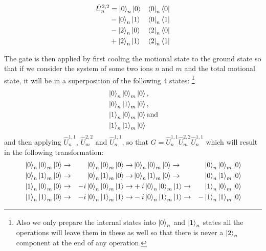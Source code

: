 \begin{equation}
    \begin{aligned}
        \hat{U}^{2,2}_n &= \ket{0}_n\ket{0}&\bra{0}_n\bra{0} \\
        &- \ket{0}_n\ket{1}&\bra{0}_n\bra{1} \\
        &- \ket{2}_n\ket{0}&\bra{2}_n\bra{0} \\
        &+ \ket{2}_n\ket{1}&\bra{2}_n\bra{1}
    \end{aligned}
\end{equation}

The gate is then applied by first cooling the motional state to the ground state so that if we consider the system of some two ions $n$ and $m$ and the total motional state, it will be in a superposition of the following 4 states:
\footnote{Also we only prepare the internal states into $\ket{0}_n$ and $\ket{1}_n$ states all the operations will leave them in these as well so that there is never a $\ket{2}_n$ component at the end of any operation.}
\begin{equation}\label{eqn:ovrl_states}
    \begin{aligned}
        &\ket{0}_n\ket{0}_m\ket{0}, \\
        &\ket{0}_n\ket{1}_m\ket{0}, \\
        &\ket{1}_n\ket{0}_m\ket{0} \text{and} \\
        &\ket{1}_n\ket{1}_m\ket{0}
    \end{aligned}
\end{equation}
and then applying $\hat{U}^{1,1}_n$, $\hat{U}^{2,2}_m$ and $\hat{U}^{1,1}_n$, so that $\hat{G} = \hat{U}^{1,1}_n \hat{U}^{2,2}_m \hat{U}^{1,1}_n$ which will result in the following transformation:
\begin{equation}
    \begin{aligned}
        &\ket{0}_n\ket{0}_m\ket{0} \rightarrow & \ket{0}_n\ket{0}_m\ket{0} \rightarrow & \ket{0}_n\ket{0}_m\ket{0} \rightarrow & \ket{0}_n\ket{0}_m\ket{0} \\
        &\ket{0}_n\ket{1}_m\ket{0} \rightarrow & \ket{0}_n\ket{1}_m\ket{0} \rightarrow & \ket{0}_n\ket{1}_m\ket{0} \rightarrow & \ket{0}_n\ket{1}_m\ket{0} \\
        &\ket{1}_n\ket{0}_m\ket{0} \rightarrow & -i\ket{0}_n\ket{0}_m\ket{1} \rightarrow & +i\ket{0}_n\ket{0}_m\ket{1} \rightarrow & \ket{1}_n\ket{0}_m\ket{0} \\
        &\ket{1}_n\ket{1}_m\ket{0} \rightarrow & -i\ket{0}_n\ket{1}_m\ket{1} \rightarrow & -i\ket{0}_n\ket{1}_m\ket{1} \rightarrow & -\ket{1}_n\ket{1}_m\ket{0}
    \end{aligned}
\end{equation}

